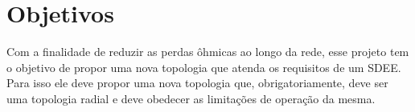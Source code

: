 \section{Objetivos}

Com a finalidade de reduzir as perdas ôhmicas ao longo da rede, esse projeto tem o objetivo de propor uma nova topologia que atenda os requisitos de um SDEE. Para isso ele deve propor uma nova topologia que, obrigatoriamente, deve ser uma topologia radial e deve obedecer as limitações de operação da mesma.